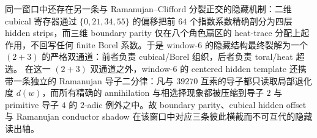 同一窗口中还存在另一条与 Ramanujan--Clifford 分裂正交的隐藏机制：二维 cubical 寄存器通过 \(\{0,21,34,55\}\) 的偏移把前 \(64\) 个指数系数精确剖分为四层 hidden strips，而三维 boundary parity 仅在八个角色扇区的 heat-trace 分配上起作用，不回写任何 finite Borel 系数。于是 window-\(6\) 的隐藏结构最终裂解为一个 \((2+3)\) 的严格双通道：前者负责 cubical/Borel 组织，后者负责 toral/heat 超选。
在这一 \((2+3)\) 双通道之外，window-\(6\) 的 centered hidden template 还携带一条独立的 Ramanujan 导子二分律：凡与 \(39270\) 互素的导子都只读取局部退化度 \(d(w)\)，而所有精确的 annihilation 与相选择现象都被压缩到导子 \(2\) 与 primitive 导子 \(4\) 的 \(2\)-adic 例外之中。故 boundary parity、cubical hidden offset 与 Ramanujan conductor shadow 在该窗口中对应三条彼此横截而不可互代的隐藏读出轴。

\endinput
